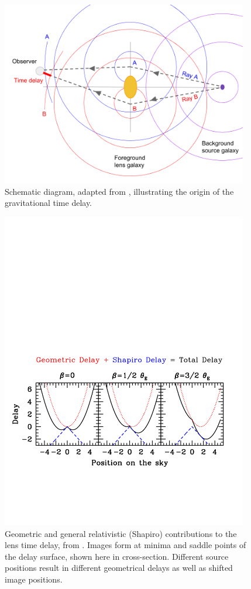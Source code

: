 \begin{figure}[!t]
\centering\includegraphics[width=0.96\textwidth]{figures/wavefront-schematic.png}
\caption{Schematic diagram, adapted from \citep{TreuAndEllis2015},
illustrating the origin of the gravitational time delay.}
\label{fig:timedelaycartoon}
\end{figure}

\begin{figure}[!ht]
\centering\includegraphics[width=0.96\textwidth]{figures/delays.pdf}
\caption{Geometric and general relativistic (Shapiro) contributions
to the lens time delay, from \citep{TreuAndEllis2015}. Images form
at minima and saddle points of the delay surface, shown here in
cross-section. Different source positions result in different
geometrical delays as well as shifted image positions.}
\label{fig:delays}
\end{figure}

